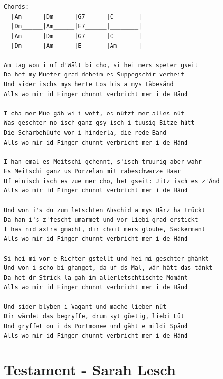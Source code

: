 \documentclass[
]{book}
\let\stdsection\section
\renewcommand\section{\clearpage\stdsection}
\begin{document}
\begin{verbatim}


Chords:
  |Am______|Dm______|G7______|C_______|
  |Dm______|Am______|E7______|________|
  |Am______|Dm______|G7______|C_______|
  |Dm______|Am______|E_______|Am______| 

Am tag won i uf d'Wält bi cho, si hei mers speter gseit
Da het my Mueter grad deheim es Suppegschir verheit
Und sider ischs mys herte Los bis a mys Läbesänd
Alls wo mir id Finger chunnt verbricht mer i de Händ

I cha mer Müe gäh wi i wott, es nützt mer alles nüt
Was geschter no isch ganz gsy isch i tuusig Bitze hütt
Die Schärbehüüfe won i hinderla, die rede Bänd
Alls wo mir id Finger chunnt verbricht mer i de Händ

I han emal es Meitschi gchennt, s'isch truurig aber wahr
Es Meitschi ganz us Porzelan mit rabeschwarze Haar
Uf einisch isch es zue mer cho, het gseit: Jitz isch es z'Änd
Alls wo mir id Finger chunnt verbricht mer i de Händ

Und won i's du zum letschten Abschid a mys Härz ha trückt
Da han i's z'fescht umarmet und vor Liebi grad erstickt
I has nid äxtra gmacht, dir chöit mers gloube, Sackermänt
Alls wo mir id Finger chunnt verbricht mer i de Händ

Si hei mi vor e Richter gstellt und hei mi geschter ghänkt
Und won i scho bi ghanget, da uf ds Mal, wär hätt das tänkt
Da het dr Strick la gah im allerletschtischte Momänt
Alls wo mir id Finger chunnt verbricht mer i de Händ

Und sider blyben i Vagant und mache lieber nüt
Dir wärdet das begryffe, drum syt güetig, liebi Lüt
Und gryffet ou i ds Portmonee und gäht e mildi Spänd
Alls wo mir id Finger chunnt verbricht mer i de Händ
\end{verbatim}

\hypertarget{testament---sarah-lesch}{%
\section{Testament - Sarah Lesch}\label{testament---sarah-lesch}}
\end{document}
